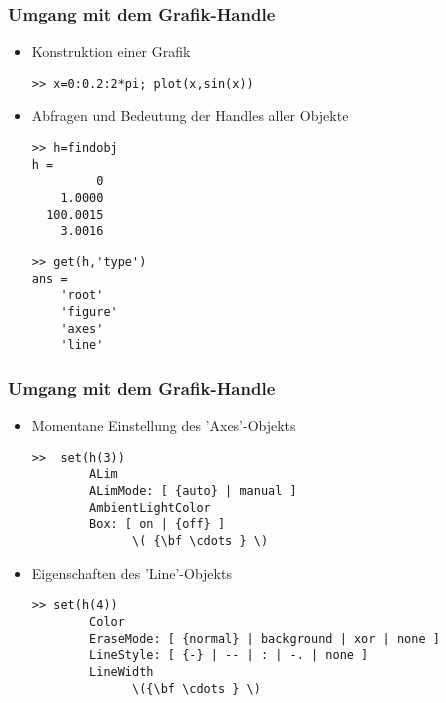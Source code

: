 % 
%
\begin{frame}[fragile]\frametitle{Umgang mit dem Grafik-Handle}
\begin{itemize}
\item Konstruktion einer Grafik
\begin{lstlisting}
>> x=0:0.2:2*pi; plot(x,sin(x))
\end{lstlisting}
\item Abfragen und Bedeutung der Handles aller Objekte\\
\begin{minipage}{4cm}
\begin{lstlisting}
>> h=findobj
h =
         0
    1.0000
  100.0015
    3.0016
\end{lstlisting}
\end{minipage} \hfill
\begin{minipage}{4cm}
\begin{lstlisting}
>> get(h,'type')
ans = 
    'root'
    'figure'
    'axes'
    'line'
\end{lstlisting} 
\end{minipage}
\end{itemize}
\end{frame}
% 
%
\begin{frame}[fragile]\frametitle{Umgang mit dem Grafik-Handle }
\begin{itemize}
\item Momentane Einstellung des 'Axes'-Objekts
\begin{lstlisting}
>>  set(h(3))
        ALim
        ALimMode: [ {auto} | manual ]
        AmbientLightColor
        Box: [ on | {off} ]
              \( {\bf \cdots } \)
\end{lstlisting}
\item Eigenschaften des 'Line'-Objekts
\begin{lstlisting}
>> set(h(4))
        Color
        EraseMode: [ {normal} | background | xor | none ]
        LineStyle: [ {-} | -- | : | -. | none ]
        LineWidth
              \({\bf \cdots } \)
\end{lstlisting}
\end{itemize}
 \end{frame}
% 
%
